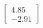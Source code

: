 \documentclass[preview]{standalone}
\begin{document}
\begin{align*}
\begin{bmatrix} 4.85 \\ -2.91 \end{bmatrix}
\end{align*}
\end{document}
